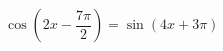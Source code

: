 \begin{ex}[type=equation]
	\begin{condition}
		$\ \cos{\left(2x - \dfrac{7\pi}{2}\right)} = \sin {(4x + 3\pi)}$
	\end{condition}
\end{ex}